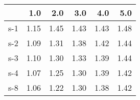 \begin{tabular}{lrrrrr}
\toprule
{} &  1.0 &  2.0 &  3.0 &  4.0 &  5.0 \\
\midrule
s-1 & 1.15 & 1.45 & 1.43 & 1.43 & 1.48 \\
s-2 & 1.09 & 1.31 & 1.38 & 1.42 & 1.44 \\
s-3 & 1.10 & 1.30 & 1.33 & 1.39 & 1.44 \\
s-4 & 1.07 & 1.25 & 1.30 & 1.39 & 1.42 \\
s-8 & 1.06 & 1.22 & 1.30 & 1.38 & 1.42 \\
\bottomrule
\end{tabular}
